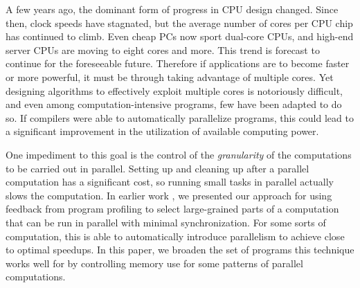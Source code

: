 
A few years ago, the dominant form of progress in CPU design changed.
Since then, clock speeds have stagnated,
but the average number of cores per CPU chip has continued to climb.
Even cheap PCs now sport dual-core CPUs,
and high-end server CPUs are moving to eight cores and more.
This trend is forecast to continue for the foreseeable future.
Therefore if applications are to become faster or more powerful,
it must be through taking advantage of multiple cores.
Yet designing algorithms to effectively exploit multiple cores
is notoriously difficult,
and even among computation-intensive programs, few have been adapted to do so.
If compilers were able to automatically parallelize programs,
this could lead to a significant improvement
in the utilization of available computing power.

One impediment to this goal is the control of the \emph{granularity}
of the computations to be carried out in parallel.
Setting up and cleaning up after a parallel computation has a significant cost,
so running small tasks in parallel actually slows the computation.
In earlier work \cite{bon-som-tplp-11},
we presented our approach for using feedback from program profiling
to select large-grained parts of a computation
that can be run in parallel with minimal synchronization.
For some sorts of computation,
this is able to automatically introduce parallelism
to achieve close to optimal speedups.
In this paper, we broaden the set of programs this technique works well for
by controlling memory use for some patterns of parallel computations.

